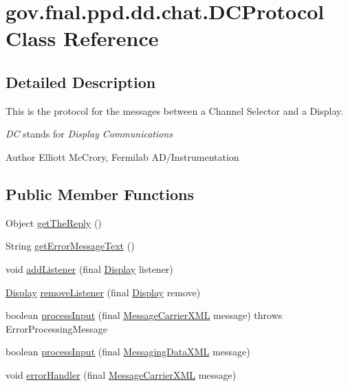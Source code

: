 \hypertarget{classgov_1_1fnal_1_1ppd_1_1dd_1_1chat_1_1DCProtocol}{\section{gov.\-fnal.\-ppd.\-dd.\-chat.\-D\-C\-Protocol Class Reference}
\label{classgov_1_1fnal_1_1ppd_1_1dd_1_1chat_1_1DCProtocol}
}


\subsection{Detailed Description}
This is the protocol for the messages between a Channel Selector and a Display. 

{\itshape D\-C} stands for {\itshape Display Communications} 

\begin{DoxyAuthor}{Author}
Elliott Mc\-Crory, Fermilab A\-D/\-Instrumentation 
\end{DoxyAuthor}
\subsection*{Public Member Functions}
\begin{DoxyCompactItemize}
\item 
Object \hyperlink{classgov_1_1fnal_1_1ppd_1_1dd_1_1chat_1_1DCProtocol_a17f34e0e46490a5296f36c383e057183}{get\-The\-Reply} ()
\item 
String \hyperlink{classgov_1_1fnal_1_1ppd_1_1dd_1_1chat_1_1DCProtocol_ac722cf203ee54e89313dba3fb6fb5a0d}{get\-Error\-Message\-Text} ()
\item 
void \hyperlink{classgov_1_1fnal_1_1ppd_1_1dd_1_1chat_1_1DCProtocol_a2557f193a252b6bd8c88216df32a0c1d}{add\-Listener} (final \hyperlink{interfacegov_1_1fnal_1_1ppd_1_1dd_1_1signage_1_1Display}{Display} listener)
\item 
\hyperlink{interfacegov_1_1fnal_1_1ppd_1_1dd_1_1signage_1_1Display}{Display} \hyperlink{classgov_1_1fnal_1_1ppd_1_1dd_1_1chat_1_1DCProtocol_a50cc43db9fbfb5d00eb14c5ef4917b2f}{remove\-Listener} (final \hyperlink{interfacegov_1_1fnal_1_1ppd_1_1dd_1_1signage_1_1Display}{Display} remove)
\item 
boolean \hyperlink{classgov_1_1fnal_1_1ppd_1_1dd_1_1chat_1_1DCProtocol_a432e76ab4d5b25e8bab88f3bc06d664c}{process\-Input} (final \hyperlink{classgov_1_1fnal_1_1ppd_1_1dd_1_1xml_1_1MessageCarrierXML}{Message\-Carrier\-X\-M\-L} message)  throws Error\-Processing\-Message 
\item 
boolean \hyperlink{classgov_1_1fnal_1_1ppd_1_1dd_1_1chat_1_1DCProtocol_acb588a2dee6973aa4deb06c78438fb35}{process\-Input} (final \hyperlink{classgov_1_1fnal_1_1ppd_1_1dd_1_1xml_1_1MessagingDataXML}{Messaging\-Data\-X\-M\-L} message)
\item 
void \hyperlink{classgov_1_1fnal_1_1ppd_1_1dd_1_1chat_1_1DCProtocol_a2416f6bc488ba5df57b6db649399ba99}{error\-Handler} (final \hyperlink{classgov_1_1fnal_1_1ppd_1_1dd_1_1xml_1_1MessageCarrierXML}{Message\-Carrier\-X\-M\-L} message)
\end{DoxyCompactItemize}
